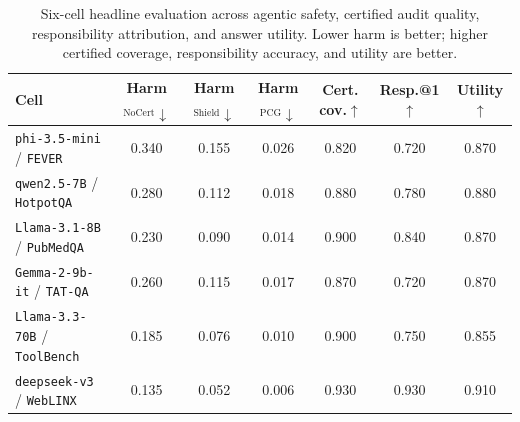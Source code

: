 \begin{table}[t]
\centering
\caption{\small Six-cell headline evaluation across agentic safety, certified audit quality, responsibility attribution, and answer utility. Lower harm is better; higher certified coverage, responsibility accuracy, and utility are better.}
\label{tab:main_six_summary}
\scriptsize
\begin{tabular}{lcccccc}
\toprule
Cell & Harm$_{\mathrm{NoCert}}\downarrow$ & Harm$_{\mathrm{Shield}}\downarrow$ & Harm$_{\mathrm{PCG}}\downarrow$ & Cert. cov.$\uparrow$ & Resp.@1$\uparrow$ & Utility$\uparrow$ \\
\midrule
\texttt{phi-3.5-mini} / \texttt{FEVER} & 0.340 & 0.155 & 0.026 & 0.820 & 0.720 & 0.870 \\
\texttt{qwen2.5-7B} / \texttt{HotpotQA} & 0.280 & 0.112 & 0.018 & 0.880 & 0.780 & 0.880 \\
\texttt{Llama-3.1-8B} / \texttt{PubMedQA} & 0.230 & 0.090 & 0.014 & 0.900 & 0.840 & 0.870 \\
\texttt{Gemma-2-9b-it} / \texttt{TAT-QA} & 0.260 & 0.115 & 0.017 & 0.870 & 0.720 & 0.870 \\
\texttt{Llama-3.3-70B} / \texttt{ToolBench} & 0.185 & 0.076 & 0.010 & 0.900 & 0.750 & 0.855 \\
\texttt{deepseek-v3} / \texttt{WebLINX} & 0.135 & 0.052 & 0.006 & 0.930 & 0.930 & 0.910 \\
\bottomrule
\end{tabular}
\end{table}
